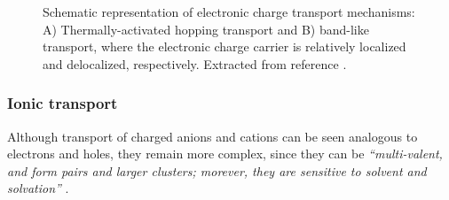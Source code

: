 

\begin{figure}[h]
	\centering
	\hspace{2em}
	\caption[Electronic transport mechanisms in OMIECs]{Schematic representation of electronic charge transport mechanisms: A) Thermally-activated hopping transport %
	and B) band-like transport, %
	where the electronic charge carrier is relatively localized and delocalized, respectively. Extracted from reference \cite{paulsenOrganicMixedIonic2020}.} 
	\label{fig:etrans}
\end{figure}


\subsubsection{Ionic transport}
Although transport of charged anions and cations can be seen analogous to electrons and holes, they remain more complex, since they can be \textit{``multi-valent, and form pairs and larger clusters; morever, they are sensitive to solvent and solvation''} \cite{paulsenOrganicMixedIonic2020}.

